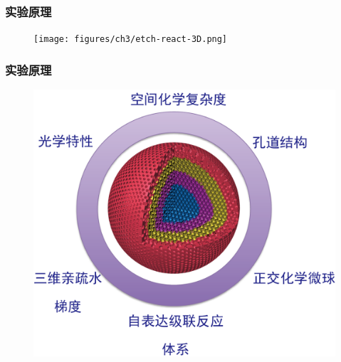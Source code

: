 \documentclass{beamer}
\begin{document}
\begin{frame}
  \frametitle{实验原理}
  \begin{figure}[htbp]
    \begin{center}
      \texttt{[image: figures/ch3/etch-react-3D.png]}
    \end{center}
  \end{figure}
\end{frame}

\begin{frame}
  \frametitle{实验原理}
  \begin{figure}
    \begin{center}
      \includegraphics[height=0.65\linewidth]{figures/schem3-2.png}
    \end{center}
  \end{figure}
\end{frame}

\end{document}
